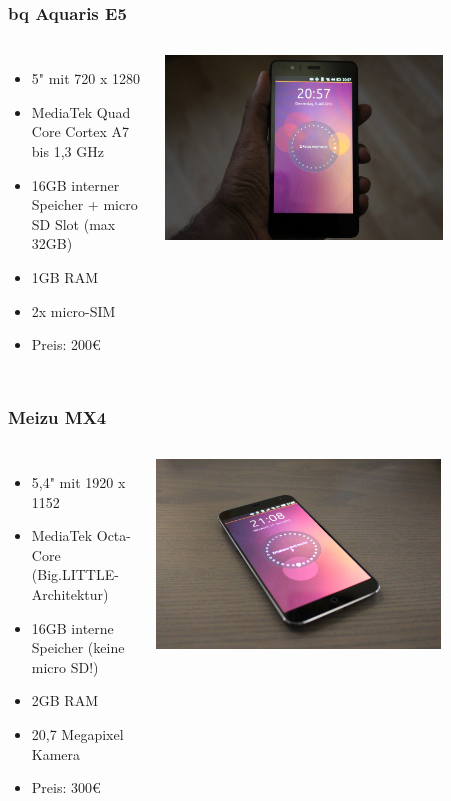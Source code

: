 \documentclass{beamer}
\begin{document}
\begin{frame}
  \frametitle{bq Aquaris E5}
  \begin{columns}
      \begin{itemize}
        \item 5" mit 720 x 1280
        \item MediaTek Quad Core Cortex A7 bis 1,3 GHz
        \item 16GB interner Speicher + micro SD Slot (max 32GB)
        \item 1GB RAM
        \item 2x micro-SIM
        \item Preis: 200€
      \end{itemize}
      \includegraphics[width=0.8\textwidth]{images/e5}
  \end{columns}
\end{frame}

\begin{frame}
  \frametitle{Meizu MX4}
  \begin{columns}
      \begin{itemize}
        \item 5,4" mit 1920 x 1152
        \item MediaTek Octa-Core (Big.LITTLE-Architektur)
        \item 16GB interne Speicher (keine micro SD!)
        \item 2GB RAM
        \item 20,7 Megapixel Kamera
        \item Preis: 300€
      \end{itemize}
      \includegraphics[width=0.8\textwidth]{images/meizumx4}
  \end{columns}
\end{frame}
\end{document}
